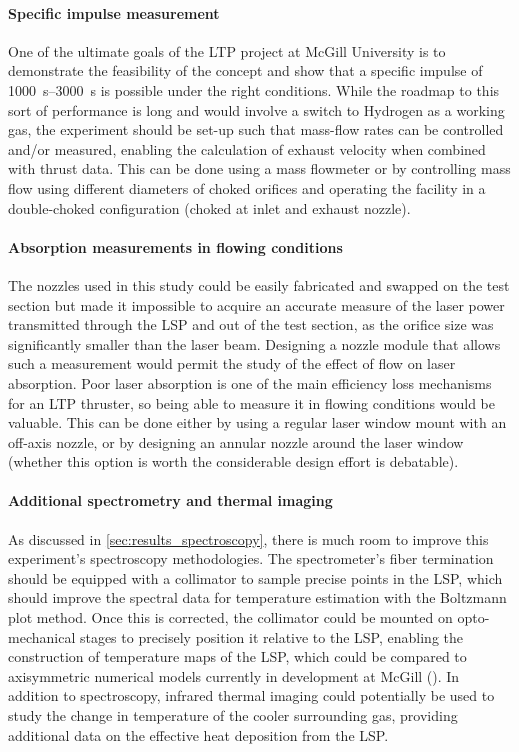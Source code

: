         \paragraph{Specific impulse measurement} One of the ultimate goals of the LTP project at McGill University is to demonstrate the feasibility of the concept and show that a specific impulse of \qtyrange{1000}{3000}{s} is possible under the right conditions. While the roadmap to this sort of performance is long and would involve a switch to Hydrogen as a working gas, the experiment should be set-up such that mass-flow rates can be controlled and/or measured, enabling the calculation of exhaust velocity when combined with thrust data. This can be done using a mass flowmeter or by controlling mass flow using different diameters of choked orifices and operating the facility in a double-choked configuration (choked at inlet and exhaust nozzle).

        \paragraph{Absorption measurements in flowing conditions} The nozzles used in this study could be easily fabricated and swapped on the test section but made it impossible to acquire an accurate measure of the laser power transmitted through the LSP and out of the test section, as the orifice size was significantly smaller than the laser beam. Designing a nozzle module that allows such a measurement would permit the study of the effect of flow on laser absorption. Poor laser absorption is one of the main efficiency loss mechanisms for an LTP thruster, so being able to measure it in flowing conditions would be valuable. This can be done either by using a regular laser window mount with an off-axis nozzle, or by designing an annular nozzle around the laser window (whether this option is worth the considerable design effort is debatable).

        \paragraph{Additional spectrometry and thermal imaging} As discussed in \autoref{sec:results_spectroscopy}, there is much room to improve this experiment's spectroscopy methodologies. The spectrometer's fiber termination should be equipped with a collimator to sample precise points in the LSP, which should improve the spectral data for temperature estimation with the Boltzmann plot method. Once this is corrected, the collimator could be mounted on opto-mechanical stages to precisely position it relative to the LSP, enabling the construction of temperature maps of the LSP, which could be compared to axisymmetric numerical models currently in development at McGill (\textcite{baoTwoDimensionalSimulationLasera}). In addition to spectroscopy, infrared thermal imaging could potentially be used to study the change in temperature of the cooler surrounding gas, providing additional data on the effective heat deposition from the LSP.